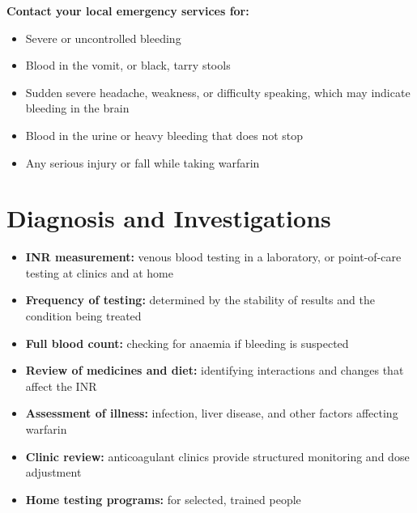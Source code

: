 \textbf{Contact your local emergency services for:}
\begin{itemize}
    \item Severe or uncontrolled bleeding
    \item Blood in the vomit, or black, tarry stools
    \item Sudden severe headache, weakness, or difficulty speaking, which may indicate bleeding in the brain
    \item Blood in the urine or heavy bleeding that does not stop
    \item Any serious injury or fall while taking warfarin
\end{itemize}

\section*{Diagnosis and Investigations}
\begin{itemize}
    \item \textbf{INR measurement:} venous blood testing in a laboratory, or point-of-care testing at clinics and at home
    \item \textbf{Frequency of testing:} determined by the stability of results and the condition being treated
    \item \textbf{Full blood count:} checking for anaemia if bleeding is suspected
    \item \textbf{Review of medicines and diet:} identifying interactions and changes that affect the INR
    \item \textbf{Assessment of illness:} infection, liver disease, and other factors affecting warfarin
    \item \textbf{Clinic review:} anticoagulant clinics provide structured monitoring and dose adjustment
    \item \textbf{Home testing programs:} for selected, trained people
\end{itemize}

